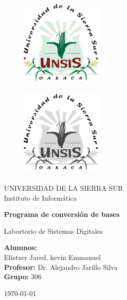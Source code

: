 \documentclass[letterpaper,12pt]{extarticle}%
\begin{document}
    \begin{titlepage}
		\begin{figure}[ht]
				\includegraphics[width=4cm]{imag//logColor.jpg}
				\label{escudoFI}
		   \endminipage

				\includegraphics[height = 4.5cm ,width=4cm]{imag//logBN.jpg} 
				\label{EscuoUNAM}
			\endminipage
		\end{figure}
		
		\vspace{0.5cm}
		
		\begin{center}
			\LARGE UNIVERSIDAD DE LA SIERRA SUR \\
			\vspace{0.3cm}
			\LARGE Instituto de Informática
			
			\vspace{.7cm} {\LARGE  \textbf{Programa de conversión de bases} \\}

			\vspace{.7cm} {\LARGE Labortorio de Sistemas Digitales}

			\vspace{.5cm}
			\begin{center}

				\LARGE{ \textbf{Alumnos:}}\\%
        \LARGE{Elietzer Jared, kevin Emmanuel}\\%
				\vspace{0.5cm}
				\textbf{Profesor:}  Dr. Alejandro Jarillo Silva \\
				\vspace{0.5cm}
				\textbf{Grupo:}  306
				
			\end{center}
			
			\vspace{1cm} \today
		\end{center}
	\end{titlepage}
\end{document}

